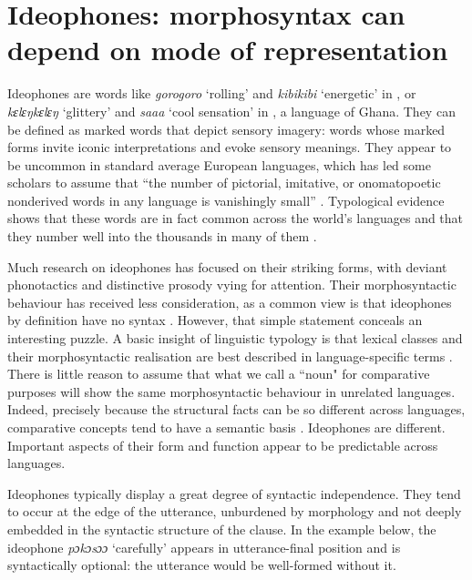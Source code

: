 \documentclass[output=paper]{langsci/langscibook}
\begin{document}
\section{Ideophones: morphosyntax can depend on mode of representation}

Ideophones are words like \textit{gorogoro} ‘rolling’ and \textit{kibikibi} ‘energetic’ in , or \textit{kɛlɛŋkɛlɛŋ} ‘glittery’ and \textit{saaa} ‘cool sensation’ in , a  language of Ghana. They can be defined as marked words that depict sensory imagery: words whose marked forms invite iconic interpretations and evoke sensory meanings. They appear to be uncommon in standard average European languages,  which has led some scholars to assume that “the number of pictorial, imitative, or onomatopoetic nonderived words in any language is vanishingly small” \citep[758]{Newmeyer1992}. Typological evidence shows that these words are in fact common across the world’s languages and that they number well into the thousands in many of them \citep{Dingemanse2012}. 


 Much research on ideophones has focused on their striking forms, with deviant phonotactics and distinctive prosody vying for attention. Their morphosyntactic behaviour has received less consideration, as a common view is that ideophones by definition have no  syntax \citep{Childs1994}. However, that simple statement conceals an interesting puzzle. A basic insight of linguistic typology is that lexical classes and their morphosyntactic realisation are best described in language-specific terms \citep{Croft2001}. There is little reason to assume that what we call a ``noun" for comparative purposes will show the same morphosyntactic behaviour in unrelated languages. Indeed, precisely because the structural facts can be so different across languages, comparative concepts tend to have a semantic basis \citep{Haspelmath2010}. Ideophones are different. Important aspects of their form and function appear to be predictable across languages.


\largerpage
{}  Ideophones typically display a great degree of syntactic independence. They tend to occur at the edge of the utterance, unburdened by morphology and not deeply embedded in the syntactic structure of the clause. In the  example below, the ideophone \textit{pɔkɔsɔɔ} ‘carefully’ appears in utterance-final position and is syntactically optional: the utterance would be well-formed without it.  
\end{document}
